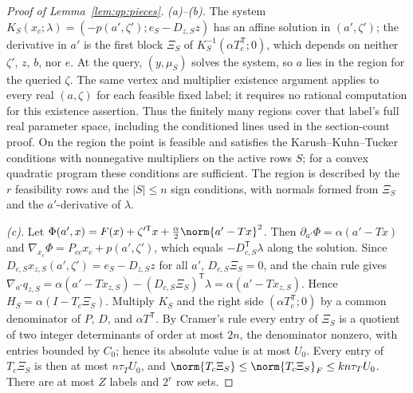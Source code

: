\begin{proof}[Proof of Lemma~\ref{lem:qp:pieces}]
\emph{(a)--(b).} The system $K_S(x_c;\lambda)=(-p(a',\zeta');e_S-D_{z,S}z)$ has
an affine solution in $(a',\zeta')$; the derivative in $a'$ is the first block
$\Xi_S$ of $K_S^{-1}(\alpha T_c^{\mathsf T};0)$, which depends on neither $\zeta'$, $z$,
$b$, nor $e$. At the query, $(y,\mu_S)$ solves the system, so $a$ lies in the
region for the queried $\zeta$. The same vertex and multiplier existence
argument applies to every real $(a,\zeta)$ for each feasible fixed label;
it requires no rational computation for this existence assertion. Thus the
finitely many regions cover that label's full real parameter space,
including the conditioned lines used in the section-count proof.
On the region the point is feasible and satisfies the
Karush--Kuhn--Tucker conditions with nonnegative multipliers on the active
rows $S$; for a convex quadratic program these conditions are sufficient. The
region is described by the $r$ feasibility rows and the $|S|\le n$ sign
conditions, with normals formed from $\Xi_S$ and the $a'$-derivative of
$\lambda$.

\emph{(c).} Let $\Phi(a',x)=F(x)+\zeta'^{\mathsf T} x+\frac\alpha2\norm{a'-Tx}^2$. Then
$\partial_{a'}\Phi=\alpha(a'-Tx)$ and $\nabla_{x_c}\Phi=P_{cc}x_c+p(a',\zeta')$,
which equals $-D_{c,S}^{\mathsf T}\lambda$ along the solution. Since
$D_{c,S}x_{z,S}(a',\zeta')=e_S-D_{z,S}z$ for all $a'$, $D_{c,S}\Xi_S=0$, and the
chain rule gives
$\nabla_{a'}q_{z,S}=\alpha(a'-Tx_{z,S})-(D_{c,S}\Xi_S)^{\mathsf T}\lambda=\alpha(a'-Tx_{z,S})$.
Hence $H_S=\alpha(I-T_c\Xi_S)$. Multiply $K_S$ and the right side
$(\alpha T_c^{\mathsf T};0)$ by a common denominator of $P$, $D$, and $\alpha T^{\mathsf T}$.
By Cramer's rule every entry of $\Xi_S$ is a quotient of two integer
determinants of order at most $2n$, the denominator nonzero, with entries
bounded by $C_0$; hence its absolute value is at most $U_0$. Every entry of
$T_c\Xi_S$ is then at most $n\tau_TU_0$, and
$\norm{T_c\Xi_S}\le\norm{T_c\Xi_S}_F\le kn\tau_TU_0$. There are at most $Z$
labels and $2^r$ row sets.
\end{proof}


